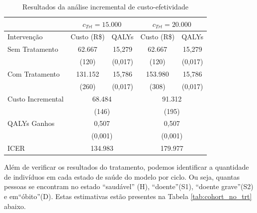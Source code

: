 \documentclass[12pt]{article}
\theoremstyle{break}
\begin{document}
\begin{table}[H] 
\centering 
\renewcommand{\arraystretch}{1.5}
\caption{Resultados da análise incremental de custo-efetividade}
\label{tab:icer_results_2}
\begin{tabular}{lcccc} 
\hline 
\hline 
& \multicolumn{2}{c}{$c_{Trt} = 15.000$} & \multicolumn{2}{c}{$c_{Trt} = 20.000$} \\
\hline
Intervenção & \multicolumn{1}{c}{Custo (R\$)} & QALYs & \multicolumn{1}{c}{Custo (R\$)} & QALYs  \\ 
\hline 
Sem Tratamento & 62.667 & 15,279 & 62.667 & 15,279 \\ 
               & (120)   & (0,017) & (120)   & (0,017) \\ 
Com Tratamento & 131.152 & 15,786 & 153.980 & 15,786 \\ 
               & (260)   & (0,017) & (308)   & (0,017) \\ 
\hline 
Custo Incremental & \multicolumn{2}{c}{68.484} & \multicolumn{2}{c}{91.312} \\ 
                  & \multicolumn{2}{c}{(146)} & \multicolumn{2}{c}{(195)} \\ 
QALYs Ganhos      & \multicolumn{2}{c}{0,507} & \multicolumn{2}{c}{0,507} \\ 
                  & \multicolumn{2}{c}{(0,001)} & \multicolumn{2}{c}{(0,001)} \\ 
ICER              & \multicolumn{2}{c}{134.983} & \multicolumn{2}{c}{179.977} \\ 
\hline 
\hline 
\end{tabular} 
\end{table}

Além de verificar os resultados do tratamento, podemos identificar a quantidade de indivíduos em cada estado de saúde do modelo por ciclo. Ou seja, quantas pessoas se encontram no estado ``saudável'' (H), ``doente''(S1), ``doente grave''(S2) e em``óbito''(D). Estas estimativas estão presentes na Tabela \ref{tab:cohort_no_trt} abaixo.
\end{document}
